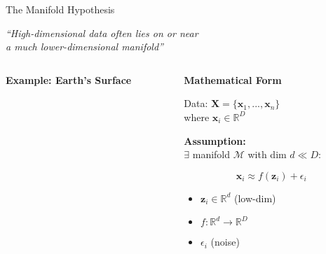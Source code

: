 \documentclass{beamer}
\begin{document}
\begin{frame}{The Manifold Hypothesis}
\vspace{-0.3cm}
\begin{center}
\colorbox{upcblue!10}{
\begin{minipage}{0.9\textwidth}
\centering
\textit{``High-dimensional data often lies on or near}\\
\textit{a much lower-dimensional manifold''}
\end{minipage}
}
\end{center}

\vspace{0.3cm}
\begin{columns}[T]
\begin{column}{0.48\textwidth}
\textbf{\color{upcblue}Example: Earth's Surface}

\begin{center}
\end{center}
\end{column}

\begin{column}{0.48\textwidth}
\textbf{\color{upcblue}Mathematical Form}

\small
Data: $\mathbf{X} = \{\mathbf{x}_1, ..., \mathbf{x}_n\}$\\
where $\mathbf{x}_i \in \mathbb{R}^D$

\vspace{0.2cm}
\textbf{Assumption:}\\
$\exists$ manifold $\mathcal{M}$ with dim $d \ll D$:

$$\mathbf{x}_i \approx f(\mathbf{z}_i) + \epsilon_i$$

\footnotesize
\begin{itemize}
    \item $\mathbf{z}_i \in \mathbb{R}^d$ (low-dim)
    \item $f: \mathbb{R}^d \rightarrow \mathbb{R}^D$
    \item $\epsilon_i$ (noise)
\end{itemize}
\end{column}
\end{columns}


\end{frame}
\end{document}
